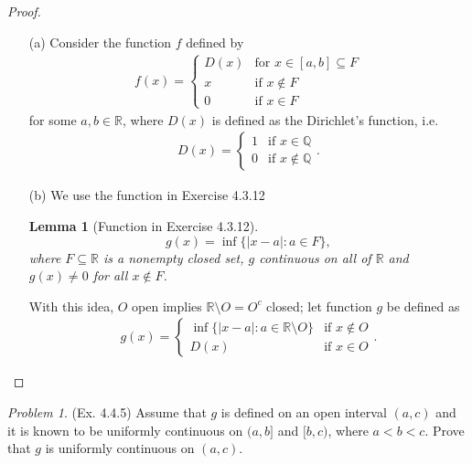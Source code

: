 \documentclass[11pt,twoside, reqno]{amsart}
\newtheorem{Lm}[Thm]{Lemma}
\theoremstyle{remark}
\newtheorem{Prob}{Problem}
\def\R{\mathbb R}
\def\Q{\mathbb Q}
\begin{document}
\begin{proof}
\begin{enumerate}
    \item [(a)] Consider the function $f$ defined by
    \begin{align*}
        f(x) =
            \begin{cases}
                D(x) & \text{for $x \in [a,b] \subseteq F$} \\
                x & \text{if $x \not \in F$} \\
                0 & \text{if $x \in F$}
            \end{cases}
    \end{align*}
    for some $a,b \in \R$, where $D(x)$ is defined as the Dirichlet's function, i.e.
    \begin{align*}
        D(x) =
            \begin{cases}
                1 & \text{if $x \in \Q$} \\
                0 & \text{if $x \not \in \Q$}
            \end{cases}.
    \end{align*}
    \item [(b)] We use the function in Exercise 4.3.12
    \begin{Lm}[Function in Exercise 4.3.12]
    $$
        g(x) = \inf \{|x-a| : a \in F\},
    $$
    where $F \subseteq \R$ is a nonempty closed set, $g$ continuous on all of $\R$ and $g(x) \neq 0$ for all $x \not \in F$.
    \end{Lm}
    With this idea, $O$ open implies $\R \setminus O = O^c$ closed; let function $g$ be defined as
    \begin{align*}
        g(x) = 
            \begin{cases}
                \inf \{|x-a| : a \in \R \setminus O\} & \text{if $x \not \in O$} \\
                D(x) & \text{if $x \in O$}
            \end{cases}.
    \end{align*}
\end{enumerate}

\end{proof}

\begin{Prob}(Ex. 4.4.5) Assume that $g$ is defined on an open interval $(a,c)$ and it is known to be uniformly continuous on $(a,b]$ and $[b,c)$, where $a < b < c$. Prove that $g$ is uniformly continuous on $(a,c)$.
\end{Prob}
\end{document}
